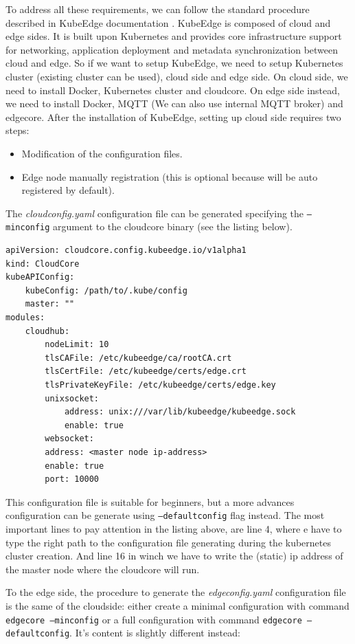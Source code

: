 To address all these requirements, we can follow the standard procedure described in KubeEdge documentation \cite{kubeedgedoc}.
KubeEdge is composed of cloud and edge sides. It is built upon Kubernetes and provides core infrastructure support for networking, application deployment and metadata synchronization between cloud and edge. So if we want to setup KubeEdge, we need to setup Kubernetes cluster (existing cluster can be used), cloud side and edge side.
On cloud side, we need to install Docker, Kubernetes cluster and cloudcore. On edge side instead, we need to install Docker, MQTT (We can also use internal MQTT broker) and edgecore. 
After the installation of KubeEdge, setting up cloud side requires two steps: 
\begin{itemize}
	\item Modification of the configuration files.
	\item Edge node manually registration (this is optional because will be auto registered by default).
\end{itemize}

The \textit{cloudconfig.yaml} configuration file can be generated specifying the \texttt{--minconfig} argument to the cloudcore binary (see the listing below).
\begin{verbatim}
apiVersion: cloudcore.config.kubeedge.io/v1alpha1
kind: CloudCore
kubeAPIConfig:
    kubeConfig: /path/to/.kube/config
    master: ""
modules:
    cloudhub:
        nodeLimit: 10
        tlsCAFile: /etc/kubeedge/ca/rootCA.crt
        tlsCertFile: /etc/kubeedge/certs/edge.crt
        tlsPrivateKeyFile: /etc/kubeedge/certs/edge.key
        unixsocket:
            address: unix:///var/lib/kubeedge/kubeedge.sock
            enable: true
        websocket:
        address: <master node ip-address>
        enable: true
        port: 10000
\end{verbatim}


This configuration file is suitable for beginners, but a more advances configuration can be generate using \texttt{--defaultconfig} flag instead.
The most important lines to pay attention in the listing above, are line 4, where e have to type the right path to the configuration file generating during the kubernetes cluster creation. And line 16 in winch we have to write the (static) ip address of the master node where the cloudcore will run.

To the edge side, the procedure to generate the \textit{edgeconfig.yaml} configuration file is the same of the cloudside: either create a minimal configuration with command \texttt{edgecore --minconfig} or a full configuration with command \texttt{edgecore --defaultconfig}. It's content is slightly different instead:



